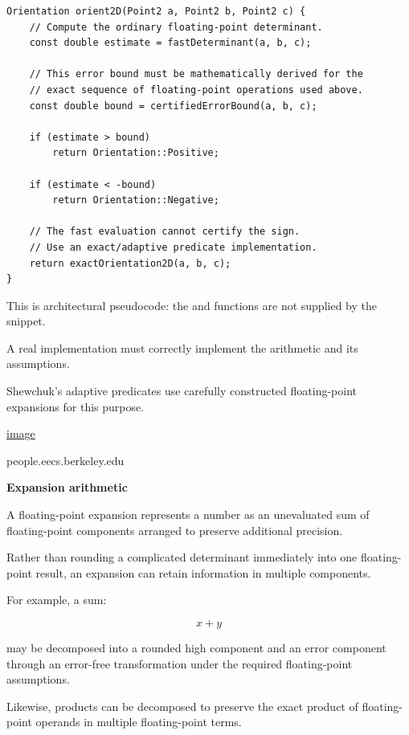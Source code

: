 \begin{verbatim}
Orientation orient2D(Point2 a, Point2 b, Point2 c) {
    // Compute the ordinary floating-point determinant.
    const double estimate = fastDeterminant(a, b, c);

    // This error bound must be mathematically derived for the
    // exact sequence of floating-point operations used above.
    const double bound = certifiedErrorBound(a, b, c);

    if (estimate > bound)
        return Orientation::Positive;

    if (estimate < -bound)
        return Orientation::Negative;

    // The fast evaluation cannot certify the sign.
    // Use an exact/adaptive predicate implementation.
    return exactOrientation2D(a, b, c);
}
\end{verbatim}

This is architectural pseudocode: the  and  functions are not supplied by the snippet.

A real implementation must correctly implement the arithmetic and its assumptions.

Shewchuk's adaptive predicates use carefully constructed floating-point expansions for this purpose. 

\href{https://www.google.com/s2/favicons?domain=https://people.eecs.berkeley.edu&sz=32}{image}

people.eecs.berkeley.edu

\textbf{Expansion arithmetic}

A floating-point expansion represents a number as an unevaluated sum of floating-point components arranged to preserve additional precision.

Rather than rounding a complicated determinant immediately into one floating-point result, an expansion can retain information in multiple components.

For example, a sum:

\[
x+y
\]

may be decomposed into a rounded high component and an error component through an error-free transformation under the required floating-point assumptions.

Likewise, products can be decomposed to preserve the exact product of floating-point operands in multiple floating-point terms.

